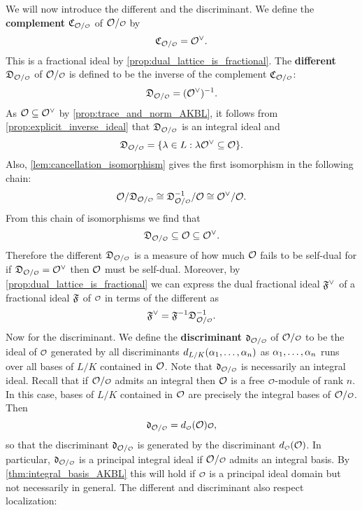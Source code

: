     We will now introduce the different and the discriminant. We define the \textbf{complement} $\mf{C}_{\mc{O}/\smc{O}}$ of $\mc{O}/\smc{O}$ by
    \[
      \mf{C}_{\mc{O}/\smc{O}} = \mc{O}^{\vee}.  
    \]
    This is a fractional ideal by \cref{prop:dual_lattice_is_fractional}. The \textbf{different} $\mf{D}_{\mc{O}/\smc{O}}$ of $\mc{O}/\smc{O}$ is defined to be the inverse of the complement $\mf{C}_{\mc{O}/\smc{O}}$: 
    \[
      \mf{D}_{\mc{O}/\smc{O}} = (\mc{O}^{\vee})^{-1}.  
    \]
    As $\mathcal{O} \subseteq \mathcal{O}^{\vee}$ by \cref{prop:trace_and_norm_AKBL}, it follows from \cref{prop:explicit_inverse_ideal} that $\mf{D}_{\mc{O}/\smc{O}}$ is an integral ideal and
    \[
      \mf{D}_{\mc{O}/\smc{O}} = \{\l \in L: \l\mc{O}^{\vee} \subseteq \mc{O}\}.  
    \]
    Also, \cref{lem:cancellation_isomorphism} gives the first isomorphism in the following chain:
    \begin{equation}\label{equ:different_isomorphism_chain}
      \mc{O}/\mf{D}_{\mc{O}/\smc{O}} \cong \mf{D}_{\mc{O}/\smc{O}}^{-1}/\mc{O} \cong \mc{O}^{\vee}/\mc{O}.
    \end{equation}
    From this chain of isomorphisms we find that
    \[
      \mf{D}_{\mc{O}/\smc{O}} \subseteq \mc{O} \subseteq \mc{O}^{\vee}.
    \]
    Therefore the different $\mf{D}_{\mc{O}/\smc{O}}$ is a measure of how much $\mathcal{O}$ fails to be self-dual for if $\mf{D}_{\mc{O}/\smc{O}} = \mc{O}^{\vee}$ then $\mathcal{O}$ must be self-dual. Moreover, by \cref{prop:dual_lattice_is_fractional} we can express the dual fractional ideal $\mathfrak{F}^{\vee}$ of a fractional ideal $\mathfrak{F}$ of $\smc{O}$ in terms of the different as
    \[
      \mf{F}^{\vee} = \mf{F}^{-1}\mf{D}_{\mc{O}/\smc{O}}^{-1}.
    \]
    Now for the discriminant. We define the \textbf{discriminant} $\mf{d}_{\mc{O}/\smc{O}}$ of $\mc{O}/\smc{O}$ to be the ideal of $\smc{O}$ generated by all discriminants $d_{L/K}(\alpha_{1},\ldots,\alpha_{n})$ as $\alpha_{1},\ldots,\alpha_{n}$ runs over all bases of $L/K$ contained in $\mathcal{O}$. Note that $\mf{d}_{\mc{O}/\smc{O}}$ is necessarily an integral ideal. Recall that if $\mc{O}/\smc{O}$ admits an integral then $\mathcal{O}$ is a free $\smc{O}$-module of rank $n$. In this case, bases of $L/K$ contained in $\mathcal{O}$ are precisely the integral bases of $\mc{O}/\smc{O}$. Then
    \[
      \mf{d}_{\mc{O}/\smc{O}} = d_{\smc{O}}(\mc{O})\smc{O},
    \]
    so that the discriminant $\mf{d}_{\mc{O}/\smc{O}}$ is generated by the discriminant $d_{\smc{O}}(\mc{O})$. In particular, $\mf{d}_{\mc{O}/\smc{O}}$ is a principal integral ideal if $\mc{O}/\smc{O}$ admits an integral basis. By \cref{thm:integral_basis_AKBL} this will hold if $\smc{O}$ is a principal ideal domain but not necessarily in general. The different and discriminant also respect localization:

